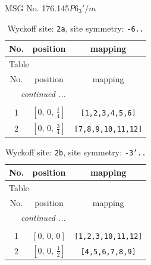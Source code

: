 \documentclass[fleqn,8pt]{jsarticle}
\begin{document}
\setcounter{MaxMatrixCols}{32}

\renewcommand{\tablename}{Table~}
\renewcommand{\figurename}{Figure~}
\begin{center}
\LARGE
MSG No. 176.145\quad$P6_{3}'/m$
\end{center}
\renewcommand{\arraystretch}{1.2}
\begin{longtable}{ccc}
\caption{Wyckoff site: {\tt 2a}, site symmetry: {\tt -6..}}
 \\
 \hline \hline
No. & position & mapping \\ \hline \endfirsthead

\multicolumn{2}{l}{\tablename\ \thetable{}} \\
 \hline \hline
No. & position & mapping \\ \hline \endhead

 \hline \hline
\multicolumn{2}{r}{\footnotesize\it continued ...} \\ \endfoot

 \hline \hline
\multicolumn{2}{r}{} \\ \endlastfoot

1 & $\left[ 0,\, 0,\, \frac{1}{4} \right]$ & {\tt [1,2,3,4,5,6]} \\ \hline
2 & $\left[ 0,\, 0,\, \frac{3}{4} \right]$ & {\tt [7,8,9,10,11,12]} \\
\end{longtable}
\renewcommand{\arraystretch}{1.2}
\begin{longtable}{ccc}
\caption{Wyckoff site: {\tt 2b}, site symmetry: {\tt -3'..}}
 \\
 \hline \hline
No. & position & mapping \\ \hline \endfirsthead

\multicolumn{2}{l}{\tablename\ \thetable{}} \\
 \hline \hline
No. & position & mapping \\ \hline \endhead

 \hline \hline
\multicolumn{2}{r}{\footnotesize\it continued ...} \\ \endfoot

 \hline \hline
\multicolumn{2}{r}{} \\ \endlastfoot

1 & $\left[ 0,\, 0,\, 0 \right]$ & {\tt [1,2,3,10,11,12]} \\ \hline
2 & $\left[ 0,\, 0,\, \frac{1}{2} \right]$ & {\tt [4,5,6,7,8,9]} \\
\end{longtable}
\end{document}
